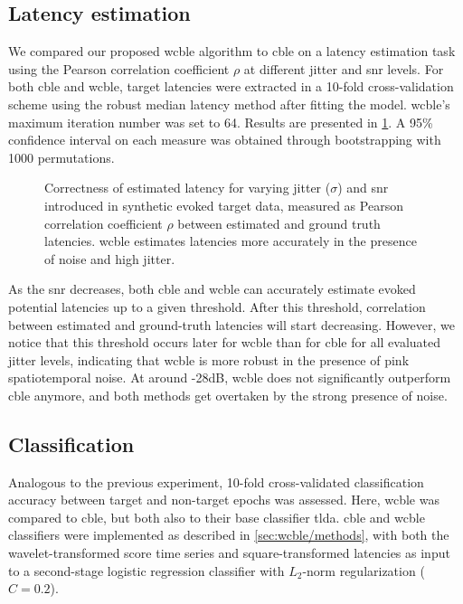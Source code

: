 \subsection{Latency estimation}
We compared our proposed \ac{wcble} algorithm to \ac{cble} on a latency
estimation task using the Pearson correlation coefficient $\rho$ at different
jitter and \ac{snr} levels.
For both \ac{cble} and \ac{wcble}, target latencies were extracted in a
10-fold cross-validation scheme using the robust median latency method after
fitting the model.
\Ac{wcble}'s maximum iteration number was set to 64.
Results are presented in \cref{fig:wcble/results/latency}.
A 95\% confidence interval on each measure was obtained through bootstrapping
with 1000 permutations.

\begin{figure}
  \sffamily\sansmath
  
  \caption[Synthetic latency estimation results]{Correctness of estimated
  latency for varying jitter ($\sigma$) and \ac{snr} introduced in synthetic evoked target
  data, measured as Pearson correlation coefficient $\rho$ between
  estimated and ground truth latencies.
  \Ac{wcble} estimates latencies more accurately in the presence of noise and
  high jitter.}
  \label{fig:wcble/results/latency}
\end{figure}

As the \ac{snr} decreases, both \ac{cble} and \ac{wcble} can accurately
estimate evoked potential latencies up to a given threshold. After this
threshold, correlation between estimated and ground-truth latencies will start
decreasing.
However, we notice that this threshold occurs later for \ac{wcble} than for
\ac{cble} for all evaluated jitter levels, indicating that \ac{wcble} is more
robust in the presence of pink spatiotemporal noise.
At around -28dB, \ac{wcble} does not significantly outperform \ac{cble}
anymore, and both methods get overtaken by the strong presence of noise.


\subsection{Classification}

Analogous to the previous experiment, 10-fold cross-validated classification
accuracy between target and non-target epochs was assessed.
Here, \ac{wcble} was compared to \ac{cble}, but both also to their base classifier
\ac{tlda}.
\Ac{cble} and \ac{wcble} classifiers were implemented as described
in \cref{sec:wcble/methods}, with both the wavelet-transformed score time series
and square-transformed latencies as input to a second-stage logistic regression
classifier with $L_2$-norm regularization ($C=0.2$).

